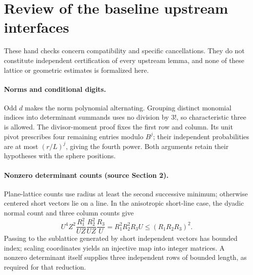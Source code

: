 \documentclass[11pt]{article}
\begin{document}
\section{Review of the baseline upstream interfaces}
These hand checks concern compatibility and specific cancellations.
They do not constitute independent certification of every upstream
lemma, and none of these lattice or geometric estimates is formalized here.

\paragraph{Norms and conditional digits.}
Odd \(d\) makes the norm polynomial alternating. Grouping distinct
monomial indices into determinant summands uses no division by \(3!\),
so characteristic three is allowed. The divisor-moment proof fixes
the first row and column. Its unit pivot prescribes four remaining
entries modulo \(B^j\); their independent probabilities are at most
\((r/L)^j\), giving the fourth power. Both arguments retain their
hypotheses with the sphere positions.

\paragraph{Nonzero determinant counts (source Section 2).}
Plane-lattice counts use radius at least the second successive minimum;
otherwise centered short vectors lie on a line. In the anisotropic
short-line case, the dyadic normal count and three column counts give
\[
 U^4Z^2\frac{R_1^2}{UZ}\frac{R_2^2}{UZ}\frac{R_3}{U}
 =R_1^2R_2^2R_3U\le(R_1R_2R_3)^2.
\]
Passing to the sublattice generated by short independent vectors
has bounded index; scaling coordinates yields an injective map into
integer matrices. A nonzero determinant itself supplies three
independent rows of bounded length, as required for that reduction.
\end{document}
